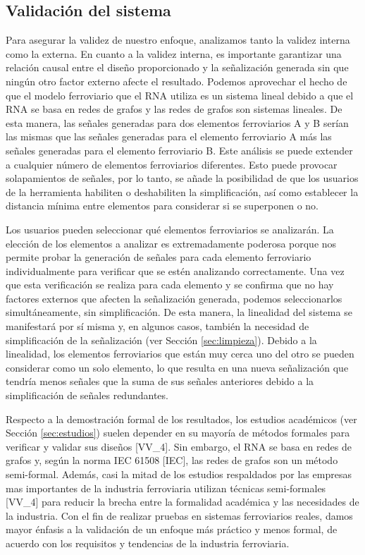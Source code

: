 \subsection{Validación del sistema}
    \label{sec:validacion}
    Para asegurar la validez de nuestro enfoque, analizamos tanto la validez interna como la externa. En cuanto a la validez interna, es importante garantizar una relación causal entre el diseño proporcionado y la señalización generada sin que ningún otro factor externo afecte el resultado. Podemos aprovechar el hecho de que el modelo ferroviario que el RNA utiliza es un sistema lineal debido a que el RNA se basa en redes de grafos y las redes de grafos son sistemas lineales. De esta manera, las señales generadas para dos elementos ferroviarios A y B serían las mismas que las señales generadas para el elemento ferroviario A más las señales generadas para el elemento ferroviario B. Este análisis se puede extender a cualquier número de elementos ferroviarios diferentes. Esto puede provocar solapamientos de señales, por lo tanto, se añade la posibilidad de que los usuarios de la herramienta habiliten o deshabiliten la simplificación, así como establecer la distancia mínima entre elementos para considerar si se superponen o no.

    Los usuarios pueden seleccionar qué elementos ferroviarios se analizarán. La elección de los elementos a analizar es extremadamente poderosa porque nos permite probar la generación de señales para cada elemento ferroviario individualmente para verificar que se estén analizando correctamente. Una vez que esta verificación se realiza para cada elemento y se confirma que no hay factores externos que afecten la señalización generada, podemos seleccionarlos simultáneamente, sin simplificación. De esta manera, la linealidad del sistema se manifestará por sí misma y, en algunos casos, también la necesidad de simplificación de la señalización (ver Sección \ref{sec:limpieza}). Debido a la linealidad, los elementos ferroviarios que están muy cerca uno del otro se pueden considerar como un solo elemento, lo que resulta en una nueva señalización que tendría menos señales que la suma de sus señales anteriores debido a la simplificación de señales redundantes.

    Respecto a la demostración formal de los resultados, los estudios académicos (ver Sección \ref{sec:estudios}) suelen depender en su mayoría de métodos formales para verificar y validar sus diseños [VV\_4]. Sin embargo, el RNA se basa en redes de grafos y, según la norma IEC 61508 [IEC], las redes de grafos son un método semi-formal. Además, casi la mitad de los estudios respaldados por las empresas mas importantes de la industria ferroviaria utilizan técnicas semi-formales [VV\_4] para reducir la brecha entre la formalidad académica y las necesidades de la industria. Con el fin de realizar pruebas en sistemas ferroviarios reales, damos mayor énfasis a la validación de un enfoque más práctico y menos formal, de acuerdo con los requisitos y tendencias de la industria ferroviaria.
    
